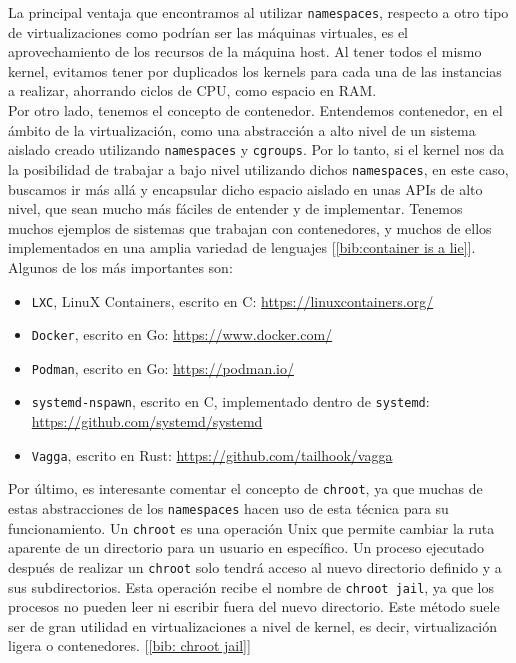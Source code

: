 \documentclass[a4paper, oneside, 12pt]{book}
\begin{document}
	\noindent La principal ventaja que encontramos al utilizar \texttt{namespaces}, respecto a otro tipo de virtualizaciones como podrían ser las máquinas virtuales, es el aprovechamiento de los recursos de la máquina host. Al tener todos el mismo kernel, evitamos tener por duplicados los kernels para cada una de las instancias a realizar, ahorrando ciclos de CPU, como espacio en RAM.\\
	
	\noindent Por otro lado, tenemos el concepto de contenedor. Entendemos contenedor, en el ámbito de la virtualización, como una abstracción a alto nivel de un sistema aislado creado utilizando \texttt{namespaces} y \texttt{cgroups}. Por lo tanto, si el kernel nos da la posibilidad de trabajar a bajo nivel utilizando dichos \texttt{namespaces}, en este caso, buscamos ir más allá y encapsular dicho espacio aislado en unas APIs de alto nivel, que sean mucho más fáciles de entender y de implementar. Tenemos muchos ejemplos de sistemas que trabajan con contenedores, y muchos de ellos implementados en una amplia variedad de lenguajes [\ref{bib:container is a lie}]. Algunos de los más importantes son:
	\begin{itemize}
		\item \texttt{LXC}, LinuX Containers, escrito en C: \url{https://linuxcontainers.org/}
		\item \texttt{Docker}, escrito en Go: \url{https://www.docker.com/}
		\item \texttt{Podman}, escrito en Go: \url{https://podman.io/}
		\item \texttt{systemd-nspawn}, escrito en C, implementado dentro de \texttt{systemd}: \url{https://github.com/systemd/systemd}
		\item \texttt{Vagga}, escrito en Rust: \url{https://github.com/tailhook/vagga}
	\end{itemize}

	\noindent Por último, es interesante comentar el concepto de \texttt{chroot}, ya que muchas de estas abstracciones de los \texttt{namespaces} hacen uso de esta técnica para su funcionamiento. Un \texttt{chroot} es una operación Unix que permite cambiar la ruta aparente de un directorio para un usuario en específico. Un proceso ejecutado después de realizar un \texttt{chroot} solo tendrá acceso al nuevo directorio definido y a sus subdirectorios. Esta operación recibe el nombre de \texttt{chroot jail}, ya que los procesos no pueden leer ni escribir fuera del nuevo directorio. Este método suele ser de gran utilidad en virtualizaciones a nivel de kernel, es decir, virtualización ligera o contenedores. [\ref{bib: chroot jail}]
	
\end{document}

